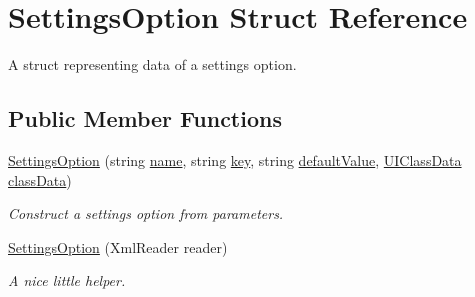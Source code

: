 \hypertarget{struct_settings_option}{}\section{Settings\+Option Struct Reference}
\label{struct_settings_option}


A struct representing data of a settings option.  


\subsection*{Public Member Functions}
\begin{DoxyCompactItemize}
\item 
\hyperlink{struct_settings_option_a5542a38db1bc61aeb988b63563bc8d62}{Settings\+Option} (string \hyperlink{struct_settings_option_a1be88b9055b5af9a446c79c9a3c83309}{name}, string \hyperlink{struct_settings_option_ac60a29ea672ec85132988edcc63231c9}{key}, string \hyperlink{struct_settings_option_ad1803ed7f7f271e958ca15612fe0f7d2}{default\+Value}, \hyperlink{struct_u_i_class_data}{U\+I\+Class\+Data} \hyperlink{struct_settings_option_abacd826cad9a79d394bffbb78f51e9eb}{class\+Data})
\begin{DoxyCompactList}\small\item\em Construct a settings option from parameters. \end{DoxyCompactList}\item 
\hyperlink{struct_settings_option_afb8bd16cfe609b68b493f311fced10b7}{Settings\+Option} (Xml\+Reader reader)
\begin{DoxyCompactList}\small\item\em A nice little helper. \end{DoxyCompactList}\end{DoxyCompactItemize}
